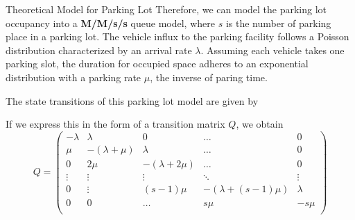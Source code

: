\documentclass[final, xcolor={table,dvipsnames},t]{beamer}
\newlength{\colwidth}
\begin{document}
\begin{frame}[t]
\begin{columns}[t]
\begin{column}{\colwidth}
\begin{alertblock}{Theoretical Model for Parking Lot}
    Therefore, we can model the parking lot occupancy into a \textbf{M/M/s/s} queue model, where $s$ is the number of parking place in a parking lot\cite{predicting}. The vehicle influx to the parking facility follows a Poisson distribution characterized by an arrival rate $\lambda$. Assuming each vehicle takes one parking slot, the duration for occupied space adheres to an exponential distribution with a parking rate $\mu$, the inverse of paring time. 

    The state transitions of this parking lot model are given by

    \begin{center}
    \end{center}

    If we express this in the form of a transition matrix $Q$, we obtain
    \begin{equation*}
        Q = \begin{pmatrix}
-\lambda & \lambda & 0 & \dots & 0 \\
\mu & -(\lambda + \mu) & \lambda & \dots & 0 \\
0 & 2\mu & -(\lambda + 2\mu) & \dots & 0 \\
\vdots & \vdots & \vdots & \ddots & \vdots \\
0 & \vdots & (s -1)\mu & -(\lambda + (s - 1)\mu) & \lambda\\
0 & 0 & \dots & s\mu & -s\mu \\
\end{pmatrix}
    \end{equation*}


\end{alertblock}
\end{column}
\end{columns}
\end{frame}
\end{document}
